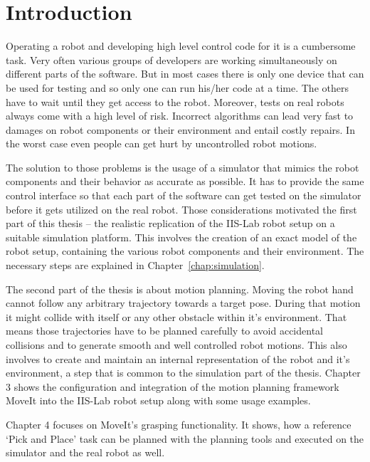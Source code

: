 
\chapter{Introduction}

Operating a robot and developing high level control code for it is a cumbersome task. Very often various groups of developers are working simultaneously on different parts of the software. But in most cases there is only one device that can be used for testing and so only one can run his/her code at a time. The others have to wait until they get access to the robot. Moreover, tests on real robots always come with a high level of risk. Incorrect algorithms can lead very fast to damages on robot components or their environment and entail costly repairs. In the worst case even people can get hurt by uncontrolled robot motions.

The solution to those problems is the usage of a simulator that mimics the robot components and their behavior as accurate as possible. It has to provide the same control interface so that each part of the software can get tested on the simulator before it gets utilized on the real robot. Those considerations motivated the first part of this thesis -- the realistic replication of the IIS-Lab robot setup on a suitable simulation platform. This involves the creation of an exact model of the robot setup, containing the various robot components and their environment. The necessary steps are explained in Chapter~\ref{chap:simulation}.

The second part of the thesis is about motion planning. Moving the robot hand cannot follow any arbitrary trajectory towards a target pose. During that motion it might collide with itself or any other obstacle within it's environment. That means those trajectories have to be planned carefully to avoid accidental collisions and to generate smooth and well controlled robot motions. This also involves to create and maintain an internal representation of the robot and it's environment, a step that is common to the simulation part of the thesis. Chapter 3 shows the configuration and integration of the motion planning framework MoveIt into the IIS-Lab robot setup along with some usage examples.

Chapter 4 focuses on MoveIt's grasping functionality. It shows, how a reference `Pick and Place' task can be planned with the planning tools  and executed on the simulator and the real robot as well.

